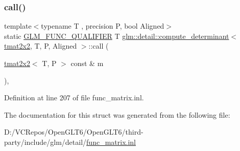 \subsubsection{\texorpdfstring{call()}{call()}}
{\footnotesize\ttfamily template$<$typename T , precision P, bool Aligned$>$ \\
static \mbox{\hyperlink{setup_8hpp_a33fdea6f91c5f834105f7415e2a64407}{G\+L\+M\+\_\+\+F\+U\+N\+C\+\_\+\+Q\+U\+A\+L\+I\+F\+I\+ER}} T \mbox{\hyperlink{structglm_1_1detail_1_1compute__determinant}{glm\+::detail\+::compute\+\_\+determinant}}$<$ \mbox{\hyperlink{structglm_1_1tmat2x2}{tmat2x2}}, T, P, Aligned $>$\+::call (\begin{DoxyParamCaption}\item[{\mbox{\hyperlink{structglm_1_1tmat2x2}{tmat2x2}}$<$ T, P $>$ const \&}]{m }\end{DoxyParamCaption})\hspace{0.3cm}{\ttfamily [inline]}, {\ttfamily [static]}}



Definition at line 207 of file func\+\_\+matrix.\+inl.



The documentation for this struct was generated from the following file\+:\begin{DoxyCompactItemize}
\item 
D\+:/\+V\+C\+Repos/\+Open\+G\+L\+T6/\+Open\+G\+L\+T6/third-\/party/include/glm/detail/\mbox{\hyperlink{func__matrix_8inl}{func\+\_\+matrix.\+inl}}\end{DoxyCompactItemize}
